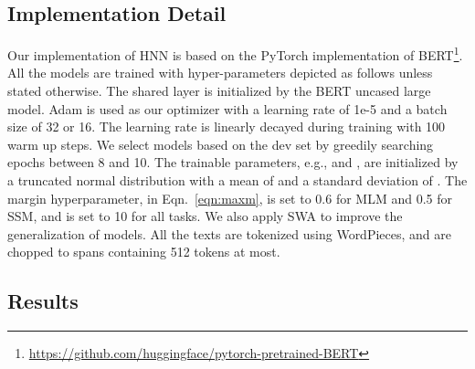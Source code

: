 \documentclass[11pt,a4paper]{article}
\newcommand{\nmodel}{HNN}
\newcommand{\wsc}{WSC}
\begin{document}
\begin{table}[!ht]
\begin{enumerate}
\end{enumerate}
\caption{Examples of transforming WNLI to {\wsc} format. Note that the text highlighted by \textcolor{brown}{brown} is the longest common substring from the left part of pronoun \textit{it}, and the text highlighted by \textcolor{violet}{violet} is the longest common substring from its right.}
\label{tab:convert}
\end{table}

\subsection{Implementation Detail}
\label{exp:imp}
Our implementation of {\nmodel} is based on the PyTorch implementation of BERT\footnote{\url{https://github.com/huggingface/pytorch-pretrained-BERT}}. All the models are trained with hyper-parameters depicted as follows unless stated otherwise.
The shared layer is initialized by the BERT uncased large model. Adam \cite{kingma2014adam} is used as our optimizer with a learning rate of 1e-5 and a batch size of 32 or 16. The learning rate is linearly decayed during training with 100 warm up steps. We select models based on the dev set by greedily searching epochs between 8 and 10. The trainable parameters, e.g.,  and , are initialized by a truncated normal distribution with a mean of  and a standard deviation of .
The margin hyperparameter,  in Eqn.~\ref{eqn:maxm}, is set to 0.6 for MLM and 0.5 for SSM, and  is set to 10 for all tasks.  
We also apply SWA \cite{izmailov2018averaging} to improve the generalization of models. All the texts are tokenized using WordPieces, and are chopped to spans containing 512 tokens at most.




\subsection{Results}
\label{exp:results}
\end{document}
